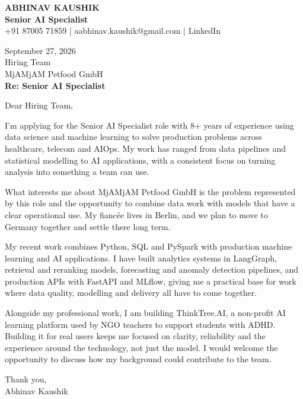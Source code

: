 \documentclass[10pt,a4paper]{article}
\begin{document}
\begin{center}
{\Large\bfseries ABHINAV KAUSHIK}\\[2pt]
{\bfseries Senior AI Specialist}\\[2pt]
+91 87005 71859 \quad | \quad aabhinav.kaushik@gmail.com \quad | \quad LinkedIn
\end{center}
\vspace{8pt}
September 27, 2026\\[6pt]
Hiring Team\\
MjAMjAM Petfood GmbH\\[4pt]
\textbf{Re: Senior AI Specialist}

Dear Hiring Team,

I’m applying for the Senior AI Specialist role with 8+ years of experience using data science and machine learning to solve production problems across healthcare, telecom and AIOps. My work has ranged from data pipelines and statistical modelling to AI applications, with a consistent focus on turning analysis into something a team can use.

What interests me about MjAMjAM Petfood GmbH is the problem represented by this role and the opportunity to combine data work with models that have a clear operational use. My fiancée lives in Berlin, and we plan to move to Germany together and settle there long term.

My recent work combines Python, SQL and PySpark with production machine learning and AI applications. I have built analytics systems in LangGraph, retrieval and reranking models, forecasting and anomaly detection pipelines, and production APIs with FastAPI and MLflow, giving me a practical base for work where data quality, modelling and delivery all have to come together.

Alongside my professional work, I am building ThinkTree.AI, a non-profit AI learning platform used by NGO teachers to support students with ADHD. Building it for real users keeps me focused on clarity, reliability and the experience around the technology, not just the model. I would welcome the opportunity to discuss how my background could contribute to the team.

Thank you,\\
Abhinav Kaushik
\end{document}

